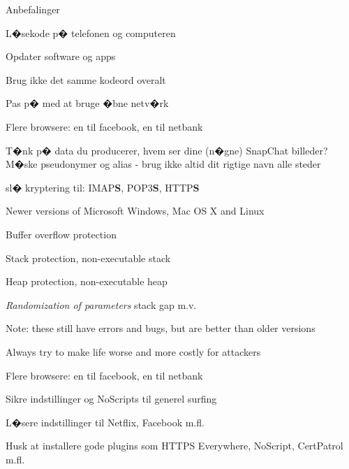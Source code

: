 \documentclass[20pt,landscape,a4paper,footrule]{foils}
\begin{document}

Anbefalinger 
\begin{list2}
\item L�sekode p� telefonen og computeren
\item Opdater software og apps
\item Brug ikke det samme kodeord overalt
\item Pas p� med at bruge �bne netv�rk
\item Flere browsere: en til facebook, en til netbank
\item T�nk p� data du producerer, hvem ser dine (n�gne) SnapChat billeder?\\
M�ske pseudonymer og alias - brug ikke altid dit rigtige navn alle steder
\item sl� kryptering til: IMAP{\bf S}, POP3{\bf S},
  HTTP{\bf S} \\
\end{list2}



\begin{list1}
\item Newer versions of Microsoft Windows, Mac OS X and Linux
\begin{list2}
\item Buffer overflow protection
\item Stack protection, non-executable stack
\item Heap protection, non-executable heap
\item \emph{Randomization of parameters} stack gap m.v.
\end{list2}
\item Note: these still have errors and bugs, but are better than older versions
\end{list1}

\vskip 1cm

\centerline{Always try to make life worse and more costly for attackers}




\begin{list2}
\item Flere browsere: en til facebook, en til netbank
\item Sikre indstillinger og NoScripts til generel surfing
\item L�sere indstillinger til Netflix, Facebook m.fl.
\item Husk at installere gode plugins som HTTPS Everywhere, NoScript, CertPatrol m.fl.
\end{list2}
\end{document}
